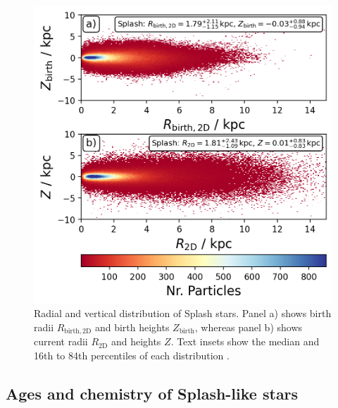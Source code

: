 \documentclass[fleqn,usenatbib]{mnras}
\begin{document}
\begin{figure}
    \centering
    \includegraphics[width=\columnwidth]{figures/splash_rz_birth_now.png}
    \caption{Radial and vertical distribution of Splash stars. Panel a) shows birth radii $R_\mathrm{birth, 2D}$ and birth heights $Z_\mathrm{birth}$, whereas panel b) shows current radii $R_\mathrm{2D}$ and heights $Z$. Text insets show the median and 16th to 84th percentiles of each distribution
    \href{https://github.com/svenbuder/golden_thread_II/tree/main/figures}{\faGithub}.}
    \label{fig:splash_rz_birth_now}
\end{figure}

\subsection{Ages and chemistry of Splash-like stars}
\end{document}
